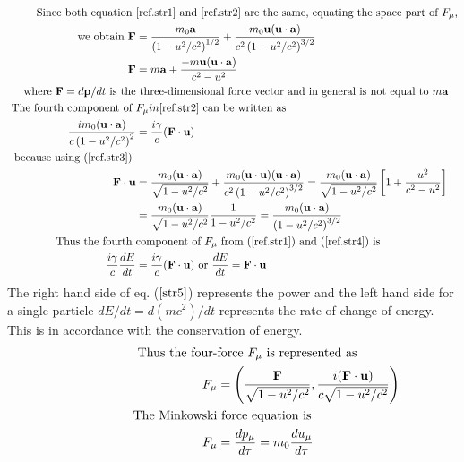 \begin{enumerate}
\begin{align}
	\text {Since both equation  }&\text{$\ref{ref.str1}$ and $\ref{ref.str2}$ are the same, equating the space part of $F_{\mu}$,}  \notag\\
	\text { we obtain }
	\mathbf{F}&=\frac{m_{0} \mathbf{a}}{\left(1-u^{2} / c^{2}\right)^{1 / 2}}+\frac{m_{0} \mathbf{u}(\mathbf{u} \cdot \mathbf{a})}{c^{2}\left(1-u^{2} / c^{2}\right)^{3 / 2}} \label{ref.str3}\\
	\mathbf{F}&=m \mathbf{a}+\frac{-m \mathbf{u}(\mathbf{u} \cdot \mathbf{a})}{c^{2}-u^{2}} \notag\\
	\text { where $\mathbf{F}=d \mathbf{p} / d t$  is the}&\text{ three-dimensional force vector and in general is not equal to $ m \mathbf{a}$} \notag\\
	\text { The fourth component of } &F_{\mu} in \ref{ref.str2} \text { can be written as }\notag \\
	\frac{i m_{0}(\mathbf{u} \cdot \mathbf{a})}{c\left(1-u^{2} / c^{2}\right)^{2}}&=\frac{i \gamma}{c}(\mathbf{F} \cdot \mathbf{u})\label{ref.str4} \\
	\text { because using ($\ref{ref.str3}$) } \notag \\
	\mathbf{F} \cdot \mathbf{u}&=\frac{m_{0}(\mathbf{u} \cdot \mathbf{a})}{\sqrt{1-u^{2} / c^{2}}}+\frac{m_{0}(\mathbf{u} \cdot \mathbf{u})(\mathbf{u} \cdot \mathbf{a})}{c^{2}\left(1-u^{2} / c^{2}\right)^{3 / 2}}=\frac{m_{0}(\mathbf{u} \cdot \mathbf{a})}{\sqrt{1-u^{2} / c^{2}}}\left[1+\frac{u^{2}}{c^{2}-u^{2}}\right] \label{str4}\\
	&=\frac{m_{0}(\mathbf{u} \cdot \mathbf{a})}{\sqrt{1-u^{2} / c^{2}}} \frac{1}{1-u^{2} / c^{2}}=\frac{m_{0}(\mathbf{u} \cdot \mathbf{a})}{\left(1-u^{2} / c^{2}\right)^{3 / 2}} \notag\\
	\text { Thus the fourth  }&\text{component of $F_{\mu}$ from ($\ref{ref.str1}$)  and ($\ref{ref.str4}$) is }\notag\\
	\frac{i \gamma}{c} \frac{d E}{d t}&=\frac{i \gamma}{c}(\mathbf{F} \cdot \mathbf{u}) \text { or } \frac{d E}{d t}=\mathbf{F} \cdot \mathbf{u} \label{str5}		
	\end{align}
	The right hand side of eq. ($\ref{str5}$) represents the power and the left hand side for a single particle $d E / d t=d\left(m c^{2}\right) / d t$ represents the rate of change of energy. This is in accordance with the conservation of energy.
	\begin{align}
	\hspace{2cm}\text{Thus the four-}&\text{force $F_{\mu}$ is represented as}\notag\\
	F_{\mu}&=\left(\frac{\mathbf{F}}{\sqrt{1-u^{2} / c^{2}}}, \frac{i(\mathbf{F} \cdot \mathbf{u})}{c \sqrt{1-u^{2} / c^{2}}}\right)\\
	\text{	The Minkowski}&\text{ force equation is }\notag\\
	F_{\mu}&=\frac{d p_{\mu}}{d \tau}=m_{0} \frac{d u_{\mu}}{d \tau}\notag
	\end{align}
\end{enumerate}
